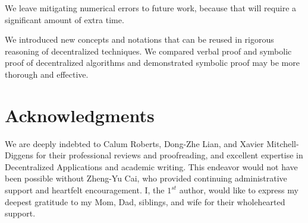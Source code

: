 \documentclass{article}
\begin{document}
We leave mitigating numerical errors to future work, because that 
will require a significant amount of extra time.

We introduced new concepts and notations that can be reused in 
rigorous reasoning 
of decentralized techniques. We compared verbal proof and symbolic proof of 
decentralized algorithms and demonstrated symbolic proof may be more thorough and effective.

\section*{Acknowledgments}
\label{Acknowledgments}

We are deeply indebted to 
Calum Roberts, Dong-Zhe Lian, and Xavier Mitchell-Diggens
for their professional reviews and proofreading,
and excellent expertise in Decentralized Applications and academic writing.
This endeavor would not have been possible without Zheng-Yu Cai, who 
provided continuing administrative support and heartfelt encouragement.
I, the $1^{st}$ author, would like to express my deepest gratitude to 
my Mom, Dad, siblings, and wife for their wholehearted support.

\nocite{*}
\printbibliography
\end{document}

